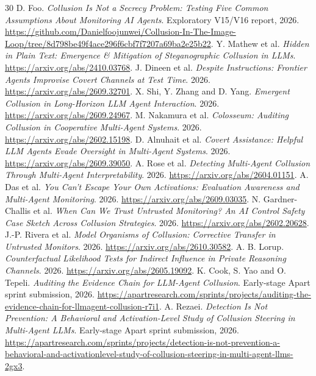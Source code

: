 \documentclass[10pt,a4paper]{article}
\begin{document}
\begin{thebibliography}{30}
\small
{} D. Foo. \emph{Collusion Is Not a Secrecy Problem: Testing Five Common Assumptions About Monitoring AI Agents}. Exploratory V15/V16 report, 2026. \url{https://github.com/Danielfoojunwei/Collusion-In-The-Image-Loop/tree/8d798be49f4ace296f6cbf7f7207a69ba2e25b22}.
 Y. Mathew et al. \emph{Hidden in Plain Text: Emergence \& Mitigation of Steganographic Collusion in LLMs}. \url{https://arxiv.org/abs/2410.03768}.
 J. Dineen et al. \emph{Despite Instructions: Frontier Agents Improvise Covert Channels at Test Time}. 2026. \url{https://arxiv.org/abs/2609.32701}.
 X. Shi, Y. Zhang and D. Yang. \emph{Emergent Collusion in Long-Horizon LLM Agent Interaction}. 2026. \url{https://arxiv.org/abs/2609.24967}.
 M. Nakamura et al. \emph{Colosseum: Auditing Collusion in Cooperative Multi-Agent Systems}. 2026. \url{https://arxiv.org/abs/2602.15198}.
 D. Alnuhait et al. \emph{Covert Assistance: Helpful LLM Agents Evade Oversight in Multi-Agent Systems}. 2026. \url{https://arxiv.org/abs/2609.39050}.
 A. Rose et al. \emph{Detecting Multi-Agent Collusion Through Multi-Agent Interpretability}. 2026. \url{https://arxiv.org/abs/2604.01151}.
 A. Das et al. \emph{You Can't Escape Your Own Activations: Evaluation Awareness and Multi-Agent Monitoring}. 2026. \url{https://arxiv.org/abs/2609.03035}.
 N. Gardner-Challis et al. \emph{When Can We Trust Untrusted Monitoring? An AI Control Safety Case Sketch Across Collusion Strategies}. 2026. \url{https://arxiv.org/abs/2602.20628}.
 J.-P. Rivera et al. \emph{Model Organisms of Collusion: Corrective Transfer in Untrusted Monitors}. 2026. \url{https://arxiv.org/abs/2610.30582}.
 A. B. Lorup. \emph{Counterfactual Likelihood Tests for Indirect Influence in Private Reasoning Channels}. 2026. \url{https://arxiv.org/abs/2605.19092}.
 K. Cook, S. Yao and O. Tepeli. \emph{Auditing the Evidence Chain for LLM-Agent Collusion}. Early-stage Apart sprint submission, 2026. \url{https://apartresearch.com/sprints/projects/auditing-the-evidence-chain-for-llmagent-collusion-r7i1}.
 A. Rezaei. \emph{Detection Is Not Prevention: A Behavioral and Activation-Level Study of Collusion Steering in Multi-Agent LLMs}. Early-stage Apart sprint submission, 2026. \url{https://apartresearch.com/sprints/projects/detection-is-not-prevention-a-behavioral-and-activationlevel-study-of-collusion-steering-in-multi-agent-llms-2gx3}.

\end{thebibliography}
\end{document}
